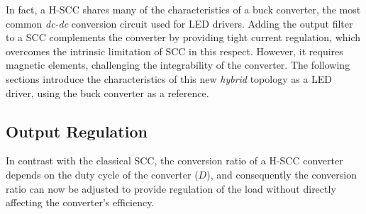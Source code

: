 In fact, a H-SCC shares many of the characteristics of a buck converter, the most common \emph{dc-dc} conversion circuit used for LED drivers. Adding the output filter to a SCC complements the converter by providing tight current regulation, which overcomes the intrinsic limitation of SCC in this respect. However, it requires magnetic elements, challenging the integrability  of the converter. The following sections introduce the characteristics of this new \emph{hybrid} topology as a LED driver, using the buck converter as a reference. %

\subsection{Output Regulation}
\label{sec:out_reg}
In contrast with the classical SCC, the conversion ratio of a H-SCC converter depends on the duty cycle of the converter ($D$), and consequently the conversion ratio can now be adjusted to provide regulation of the load without directly affecting the converter's efficiency.

